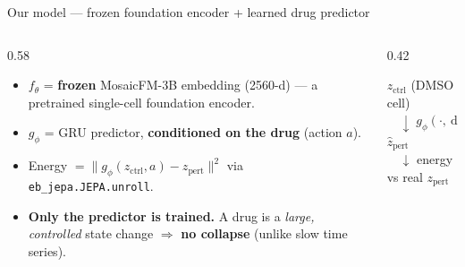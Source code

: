 \documentclass[aspectratio=169]{beamer}
\newcommand{\hl}[1]{\textcolor{secondary}{\textbf{#1}}}
\begin{document}
\begin{frame}{Our model --- frozen foundation encoder + learned drug predictor}
\begin{columns}
\begin{column}{0.58\textwidth}\small
\begin{itemize}
  \item \hl{$f_\theta$} = \textbf{frozen} MosaicFM-3B embedding (2560-d) --- a pretrained single-cell foundation encoder.
  \item \hl{$g_\phi$} = GRU predictor, \hl{conditioned on the drug} (action $a$).
  \item Energy $=\lVert g_\phi(z_{\text{ctrl}}, a) - z_{\text{pert}}\rVert^2$ via \texttt{eb\_jepa.JEPA.unroll}.
  \item \hl{Only the predictor is trained.} A drug is a \emph{large, controlled} state change $\Rightarrow$ \hl{no collapse} (unlike slow time series).
\end{itemize}
\end{column}
\begin{column}{0.42\textwidth}
\footnotesize
\begin{tcolorbox}[colback=secondary!8,colframe=primary,title={Pipeline}]
$z_{\text{ctrl}}$ (DMSO cell)\\
$\quad\downarrow\; g_\phi(\cdot,\ \text{drug})$\\
$\hat z_{\text{pert}}$\\
$\quad\downarrow$ energy vs real $z_{\text{pert}}$
\end{tcolorbox}
\end{column}
\end{columns}
\end{frame}
\end{document}
